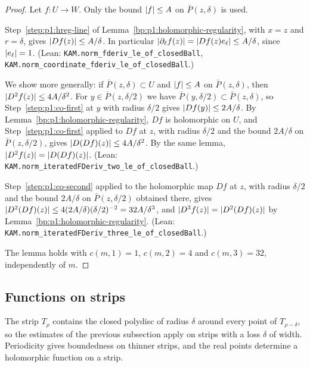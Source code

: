 \begin{proof}
Let $f:U\to W$. Only the bound $\lvert f\rvert\le A$ on $\bar P(z,\delta)$ is used.

\label{step:p1:co-first}
Step~\ref{step:p1:hreg-line} of Lemma~\ref{bp:p1:holomorphic-regularity}, with $x=z$ and $r=\delta$, gives
$\lvert Df(z)\rvert\le A/\delta$. In particular $\lvert \partial_\ell f(z)\rvert=\lvert Df(z)e_\ell\rvert\le A/\delta$, since
$\lvert e_\ell\rvert=1$. (Lean: \nolinkurl{KAM.norm_fderiv_le_of_closedBall},
\nolinkurl{KAM.norm_coordinate_fderiv_le_of_closedBall}.)

\label{step:p1:co-second}
We show more generally: if $\bar P(z,\delta)\subset U$ and $\lvert f\rvert\le A$ on $\bar P(z,\delta)$, then
$\lvert D^2f(z)\rvert\le4A/\delta^2$. For $y\in\bar P(z,\delta/2)$ we have $\bar P(y,\delta/2)\subset
\bar P(z,\delta)$, so Step~\ref{step:p1:co-first} at $y$ with radius $\delta/2$ gives
$\lvert Df(y)\rvert\le2A/\delta$. By Lemma~\ref{bp:p1:holomorphic-regularity}, $Df$ is holomorphic on $U$, and
Step~\ref{step:p1:co-first} applied to $Df$ at $z$, with radius $\delta/2$ and the bound $2A/\delta$ on
$\bar P(z,\delta/2)$, gives $\lvert D(Df)(z)\rvert\le4A/\delta^2$. By the same lemma,
$\lvert D^2f(z)\rvert=\lvert D(Df)(z)\rvert$. (Lean: \nolinkurl{KAM.norm_iteratedFDeriv_two_le_of_closedBall}.)

\label{step:p1:co-third}
Step~\ref{step:p1:co-second} applied to the holomorphic map $Df$ at $z$, with radius $\delta/2$ and the
bound $2A/\delta$ on $\bar P(z,\delta/2)$ obtained there, gives
$\lvert D^2(Df)(z)\rvert\le4(2A/\delta)(\delta/2)^{-2}=32A/\delta^3$, and $\lvert D^3f(z)\rvert=\lvert D^2(Df)(z)\rvert$ by
Lemma~\ref{bp:p1:holomorphic-regularity}. (Lean:
\nolinkurl{KAM.norm_iteratedFDeriv_three_le_of_closedBall}.)

\label{step:p1:co-constants}
The lemma holds with $c(m,1)=1$, $c(m,2)=4$ and $c(m,3)=32$, independently of $m$.
\end{proof}

\subsection{Functions on strips}\label{bp:p1:sec-strips}

The strip $T_\rho$ contains the closed polydisc of radius $\delta$ around every point of $T_{\rho-\delta}$,
so the estimates of the previous subsection apply on strips with a loss $\delta$ of width. Periodicity
gives boundedness on thinner strips, and the real points determine a holomorphic function on a strip.

